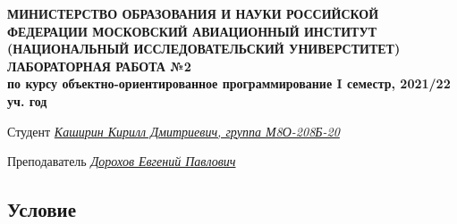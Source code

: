 \documentclass[12pt]{article}
\begin{document}
\begin{titlepage}
\begin{center}
\textbf{МИНИСТЕРСТВО ОБРАЗОВАНИЯ И НАУКИ РОССИЙСКОЙ ФЕДЕРАЦИИ
\medskip
МОСКОВСКИЙ АВИАЦИОННЫЙ ИНСТИТУТ
(НАЦИОНАЛЬНЫЙ ИССЛЕДОВАТЕЛЬСКИЙ УНИВЕРСТИТЕТ)
\vfill\vfill
{\Huge ЛАБОРАТОРНАЯ РАБОТА №2} \\
по курсу объектно-ориентированное программирование
I семестр, 2021/22 уч. год}
\end{center}
\vfill

Студент \uline{\it {Каширин Кирилл Дмитриевич, группа М8О-208Б-20}\hfill}

Преподаватель \uline{\it {Дорохов Евгений Павлович}\hfill}

\vfill
\end{titlepage}

\subsection*{Условие}
\end{document}
